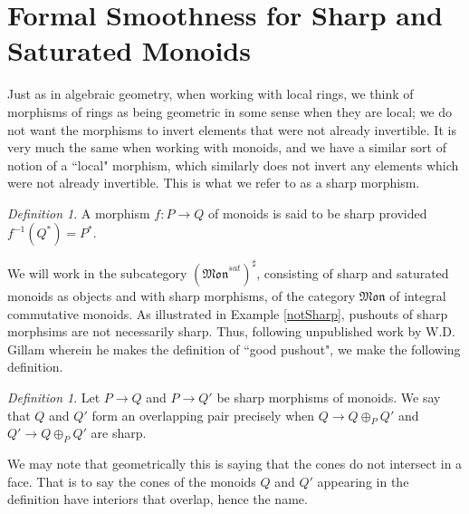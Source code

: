 \documentclass[12pt]{amsart}
\numberwithin{equation}{section}
\theoremstyle{plain}
\theoremstyle{remark}
\newtheorem{defn}[equation]{Definition}
\newcommand{\Mon}{\mathfrak{Mon}}
\begin{document}
\section{Formal Smoothness for Sharp and Saturated Monoids}

Just as in algebraic geometry, when working with local rings, we think of morphisms of rings as being geometric in some sense when they are local; we do not want the morphisms to invert elements that were not already invertible. It is very much the same when working with monoids, and we have a similar sort of notion of a ``local" morphism, which similarly does not invert any elements which were not already invertible. This is what we refer to as a sharp morphism.
\begin{defn}
	A morphism $f:P\to Q$ of monoids is said to be sharp provided $f^{-1}(Q^*) = P^*$.
\end{defn}
We will work in the subcategory $(\Mon^{sat})^{\sharp}$, consisting of sharp and saturated monoids as objects and with sharp morphisms, of the category $\Mon$ of integral commutative monoids. As illustrated in Example \eqref{notSharp}, pushouts of sharp morphsims are not necessarily sharp. Thus, following unpublished work by W.D. Gillam wherein he makes the definition of ``good pushout", we make the following definition.
\begin{defn}\label{overlappingPair}
	Let $P\to Q$ and $P\to Q'$ be sharp morphisms of monoids. We say that $Q$ and $Q'$ form an overlapping pair precisely when $Q\to Q\oplus_P Q'$ and $Q'\to Q\oplus_P Q'$ are sharp.
\end{defn}
We may note that geometrically this is saying that the cones do not intersect in a face. That is to say the cones of the monoids $Q$ and $Q'$ appearing in the definition have interiors that overlap, hence the name.
\end{document}
